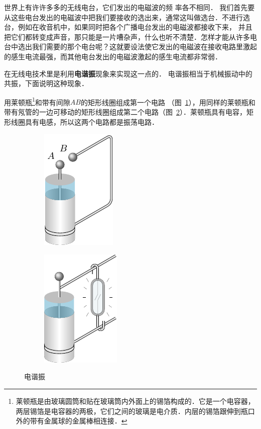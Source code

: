 世界上有许许多多的无线电台，它们发出的电磁波的频
率各不相同．
我们首先要从这些电台发出的电磁波中把我们要接收的选出来，通常这叫做选台．不进行选台，例如在收音机中，如果同时把各个广播电台发出的电磁波都接收下来，
并且把它们都转变成声音，那只能是一片嘈杂声，什么也听不清楚．怎样才能从许多电台中选出我们需要的那个电台呢？这就要设法使它发出的电磁波在接收电路里激起的感生电流最强，而其他电台发出的电磁波激起的感生电流都非常弱．

在无线电技术里是利用\textbf{电谐振}现象来实现这一点的．
电谐振相当于机械振动中的共振，下面说明这种现象．

用莱顿瓶\footnote{莱顿瓶是由玻璃圆筒和贴在玻璃筒内外面上的锡箔构成的．它是一个电容器，两层锡箔是电容器的两极，它们之间的玻璃是电介质．内层的锡箔跟伸到瓶口外的带有金属球的金属棒相连接．}和带有间隙$AB$的矩形线圈组成第一个电路
（图~\ref{fig_C_4-16a}），用同样的莱顿瓶和带有氖管的一边可移动的矩形线圈组成第二个电路（图~\ref{fig_C_4-16b}）．莱顿瓶具有电容，矩形线圈具有电感，所以这两个电路都是振荡电路．
\begin{figure}[htbp]
    \centering
    \begin{subfigure}{0.4\linewidth}
        \centering
        \includegraphics{fig/C/4-16a.pdf}
        \caption{}\label{fig_C_4-16a}
    \end{subfigure}
    \hfil
    \begin{subfigure}{0.4\linewidth}
        \centering
        \includegraphics{fig/C/4-16b.pdf}
        \caption{}\label{fig_C_4-16b}
    \end{subfigure}
    \caption{电谐振}\label{fig_C_4-16}
\end{figure}

